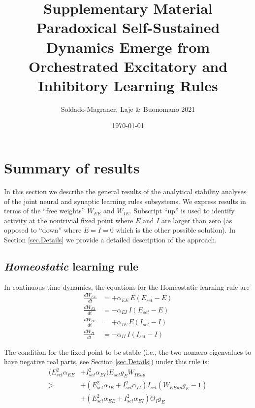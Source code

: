 \documentclass[twocolumn]{article}
\newcommand{\EE}{\mathit{EE}}
\newcommand{\EI}{\mathit{EI}}
\newcommand{\IE}{\mathit{IE}}
\newcommand{\II}{\mathit{II}}
\newcommand{\set}{\mathit{set}}
\newcommand{\up}{\mathit{up}}
\begin{document}
\title{\vspace{-2.0cm}Supplementary Material\\{\bf Paradoxical Self-Sustained Dynamics Emerge from Orchestrated Excitatory and Inhibitory Learning Rules}}
\author{Soldado-Magraner, Laje \& Buonomano 2021}
\date{\today}

\maketitle

\tableofcontents

\section{Summary of results}

In this section we describe the general results of the analytical stability analyses of the joint neural and synaptic learning rules subsystems. We express results in terms of the ``free weights'' $W_{\EE}$ and $W_{\IE}$. Subscript ``up'' is used to identify activity at the nontrivial fixed point where $E$ and $I$ are larger than zero (as opposed to ``down'' where $E=I=0$ which is the other possible solution). In Section \ref{sec.Details} we provide a detailed description of the approach.


\subsection{{\em Homeostatic} learning rule}

In continuous-time dynamics, the equations for the Homeostatic learning rule are
\begin{equation}
\begin{aligned}
\frac{dW_{\EE}}{dt} & = +\alpha_{\EE} \, E (E_{\set} - E) \\
\frac{dW_{\EI}}{dt} & = -\alpha_{\EI} \, I (E_{\set} - E) \\
\frac{dW_{\IE}}{dt} & = +\alpha_{\IE} \, E (I_{\set} - I) \\
\frac{dW_{\II}}{dt} & = -\alpha_{\II} \, I (I_{\set} - I)
\end{aligned}
\label{eq.SH_summary}
\end{equation}

\noindent The condition for the fixed point to be stable (i.e., the two nonzero eigenvalues to have negative real parts, see Section \ref{sec.Details}) under this rule is:
\begin{equation}
\begin{aligned}
(E_{\set}^2 \alpha_{\EE} & + I_{\set}^2 \alpha_{\EI}) E_{\set} g_E W_{\IE\up} \\
> & + (E_{\set}^2 \alpha_{\IE} + I_{\set}^2 \alpha_{\II}) I_{\set}(W_{\EE\up} g_E - 1) \\
& + (E_{\set}^2 \alpha_{\EE} + I_{\set}^2 \alpha_{\EI}) \Theta_I g_E
\end{aligned}
\label{eq.SH_stable_cond_v1_summary}
\end{equation}
\end{document}
